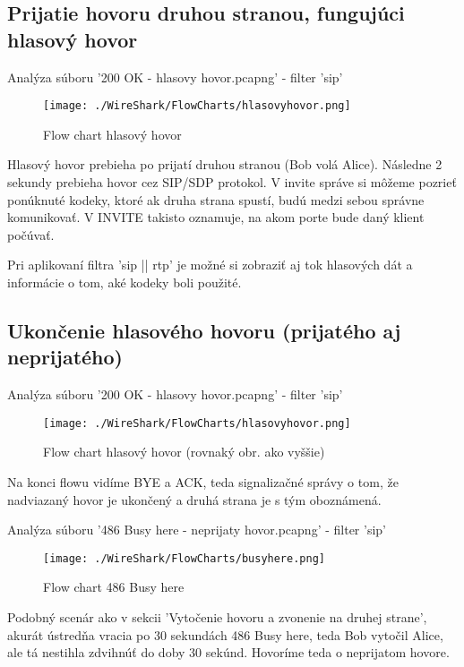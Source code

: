 \documentclass[10pt,oneside,slovak,a4paper]{article}
\begin{document}
\newpage

\subsection{Prijatie hovoru druhou stranou, fungujúci hlasový hovor}
Analýza súboru '200 OK - hlasovy hovor.pcapng' - filter 'sip'
\begin{figure}[h]
\centerline{\texttt{[image: ./WireShark/FlowCharts/hlasovyhovor.png]}} 
\caption{Flow chart hlasový hovor}
\end{figure}
Hlasový hovor prebieha po prijatí druhou stranou (Bob volá Alice). Následne 2 sekundy prebieha hovor cez SIP/SDP protokol. V invite správe si môžeme pozrieť ponúknuté kodeky, ktoré ak druha strana spustí, budú medzi sebou správne komunikovať. V INVITE takisto oznamuje, na akom porte bude daný klient počúvať.

\medskip

Pri aplikovaní filtra 'sip || rtp' je možné si zobraziť aj tok hlasových dát a informácie o tom, aké kodeky boli použité.

\newpage

\subsection{Ukončenie hlasového hovoru (prijatého aj neprijatého)}

Analýza súboru '200 OK - hlasovy hovor.pcapng' - filter 'sip'
\begin{figure}[h]
\centerline{\texttt{[image: ./WireShark/FlowCharts/hlasovyhovor.png]}} 
\caption{Flow chart hlasový hovor (rovnaký obr. ako vyššie)}
\end{figure}

Na konci flowu vidíme BYE a ACK, teda signalizačné správy o tom, že nadviazaný hovor je ukončený a druhá strana je s tým oboznámená.

\medskip

Analýza súboru '486 Busy here - neprijaty hovor.pcapng' - filter 'sip'
\begin{figure}[h]
\centerline{\texttt{[image: ./WireShark/FlowCharts/busyhere.png]}} 
\caption{Flow chart 486 Busy here}
\end{figure}

Podobný scenár ako v sekcii 'Vytočenie hovoru a zvonenie na druhej strane', akurát ústredňa vracia po 30 sekundách 486 Busy here, teda Bob vytočil Alice, ale tá nestihla zdvihnúť do doby 30 sekúnd. Hovoríme teda o neprijatom hovore.
\end{document}
